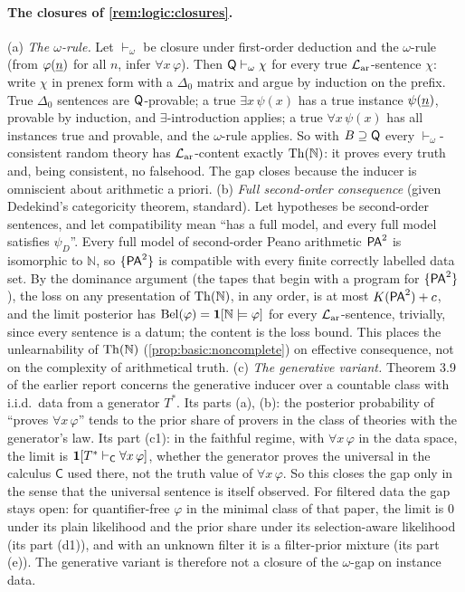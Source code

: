 \paragraph{The closures of \cref{rem:logic:closures}.} (a) \emph{The $\omega$-rule.} Let $\vdash_\omega$ be closure under first-order deduction and the $\omega$-rule (from $\varphi(\underline{n})$ for all $n$, infer $\forall x\,\varphi$). Then $\mathsf{Q}\vdash_\omega\chi$ for every true $\mathcal{L}_{\mathrm{ar}}$-sentence $\chi$: write $\chi$ in prenex form with a $\Delta_0$ matrix and argue by induction on the prefix. True $\Delta_0$ sentences are $\mathsf{Q}$-provable; a true $\exists x\,\psi(x)$ has a true instance $\psi(\underline{n})$, provable by induction, and $\exists$-introduction applies; a true $\forall x\,\psi(x)$ has all instances true and provable, and the $\omega$-rule applies. So with $B\supseteq\mathsf{Q}$ every $\vdash_\omega$-consistent random theory has $\mathcal{L}_{\mathrm{ar}}$-content exactly $\mathrm{Th}(\mathbb N)$: it proves every truth and, being consistent, no falsehood. The gap closes because the inducer is omniscient about arithmetic a priori.
(b) \emph{Full second-order consequence} (given Dedekind's categoricity theorem, standard). Let hypotheses be second-order sentences, and let compatibility mean ``has a full model, and every full model satisfies $\psi_D$''. Every full model of second-order Peano arithmetic $\mathsf{PA}^2$ is isomorphic to $\mathbb N$, so $\{\mathsf{PA}^2\}$ is compatible with every finite correctly labelled data set. By the dominance argument (the tapes that begin with a program for $\{\mathsf{PA}^2\}$), the loss on any presentation of $\mathrm{Th}(\mathbb N)$, in any order, is at most $K(\mathsf{PA}^2)+c$, and the limit posterior has $\mathrm{Bel}(\varphi)=\mathbf{1}[\mathbb N\models\varphi]$ for every $\mathcal{L}_{\mathrm{ar}}$-sentence, trivially, since every sentence is a datum; the content is the loss bound. This places the unlearnability of $\mathrm{Th}(\mathbb N)$ (\cref{prop:basic:noncomplete}) on effective consequence, not on the complexity of arithmetical truth.
(c) \emph{The generative variant.} Theorem 3.9 of the earlier report concerns the generative inducer over a countable class with i.i.d.\ data from a generator $T^*$. Its parts (a), (b): the posterior probability of ``proves $\forall x\,\varphi$'' tends to the prior share of provers in the class of theories with the generator's law. Its part (c1): in the faithful regime, with $\forall x\,\varphi$ in the data space, the limit is $\mathbf{1}[T^*\vdash_{\mathsf C}\forall x\,\varphi]$, whether the generator proves the universal in the calculus $\mathsf C$ used there, not the truth value of $\forall x\,\varphi$. So this closes the gap only in the sense that the universal sentence is itself observed. For filtered data the gap stays open: for quantifier-free $\varphi$ in the minimal class of that paper, the limit is $0$ under its plain likelihood and the prior share under its selection-aware likelihood (its part (d1)), and with an unknown filter it is a filter-prior mixture (its part (e)). The generative variant is therefore not a closure of the $\omega$-gap on instance data.

